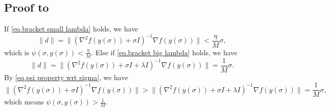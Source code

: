 \documentclass[moor,sglanonrev]{informs4}
\begin{document}
\begin{APPENDICES}
    \subsection*{Proof to }
    If \eqref{eq.bracket small lambda} holds, we have
    \begin{equation*}
        \|d\| = \|(\nabla^2 f(y(\sigma))+\sigma I)^{-1}\nabla f(y(\sigma))\|<\frac{\eta}{M}\sigma,
    \end{equation*}
    which is $\psi(\sigma,y(\sigma))<\frac{\eta}{M}$.
    Else if \eqref{eq.bracket big lambda} holds, we have
    \begin{equation*}
        \|d\| = \|(\nabla^2 f(y(\sigma))+\sigma I+\lambda I)^{-1}\nabla f(y(\sigma))\|=\frac{1}{M}\sigma.
    \end{equation*}
    By \eqref{eq.psi property wrt sigma}, we have
    \begin{equation*}
        \|(\nabla^2 f(y(\sigma))+\sigma I)^{-1}\nabla f(y(\sigma))\|> \|(\nabla^2 f(y(\sigma))+\sigma I+\lambda I)^{-1}\nabla f(y(\sigma))\|=\frac{1}{M}\sigma,
    \end{equation*}
    which means $\psi (\sigma,y(\sigma))>\frac{1}{M}$.
    \Halmos \endproof



\end{APPENDICES}
\end{document}
